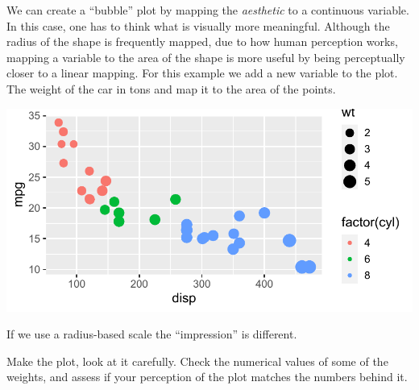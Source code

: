 \documentclass[krantz2]{krantz}\usepackage{knitr}
\begin{document}
We can create a ``bubble'' plot by mapping the  \emph{aesthetic} to a continuous variable. In this case, one has to think what is visually more meaningful. Although the radius of the shape is frequently mapped, due to how human perception works, mapping a variable to the area of the shape is more useful by being perceptually closer to a linear mapping. For this example we add a new variable to the plot. The weight of the car in tons and map it to the area of the points.

\begin{knitrout}\footnotesize
{}\color{fgcolor}\begin{kframe}
\begin{alltt}
\hlstd{(}  \hlstd{(}   
                           \hlstd{=} 
                            \hlopt{+}
  \hlstd{()} \hlopt{+}
  \hlstd{()}
\end{alltt}
\end{kframe}

{\centering \includegraphics[width=.7\textwidth]{figure/pos-scatter-16-1} 

}


\end{knitrout}

\begin{playground}
If we use a radius-based scale the ``impression'' is different.

\begin{knitrout}\footnotesize
{}\color{fgcolor}\begin{kframe}
\begin{alltt}
\hlstd{(}  \hlstd{(}   
                           \hlstd{=} 
                            \hlopt{+}
  \hlstd{()} \hlopt{+}
  \hlstd{()}
\end{alltt}
\end{kframe}
\end{knitrout}

Make the plot, look at it carefully. Check the numerical values of some of the weights, and assess if your perception of the plot matches the numbers behind it.
\end{playground}
\end{document}
